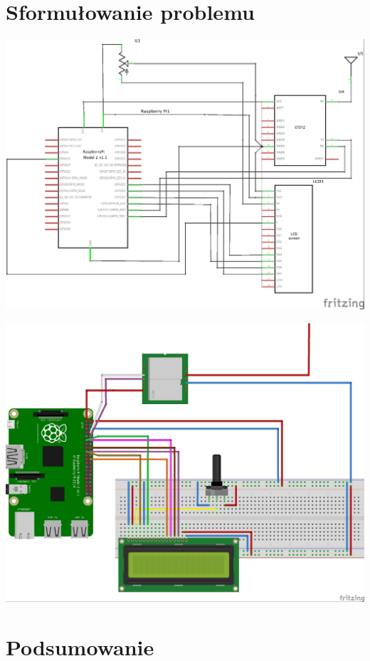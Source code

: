 \documentclass{article}
\begin{document}
\section{Sformułowanie problemu}
		
			\begin{center}
				\includegraphics[width=0.9\linewidth]{schemat-podlaczenia_schem.jpg}
			\end{center}
			

		\begin{center}
			\includegraphics[width=0.9\linewidth]{schemat-podlaczenia_bb.jpg}
		\end{center}
	
\section{Podsumowanie}
\end{document}
